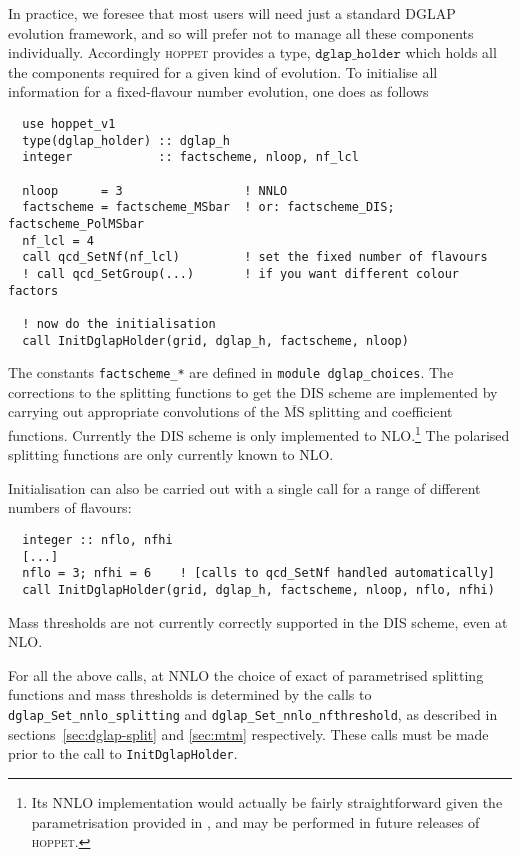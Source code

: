 \documentclass[12pt]{article}
\newcommand{\MSbar}{\overline{\mathrm{MS}}}
\newcommand{\hoppet}{\textsc{hoppet}\xspace}
\newcommand{\ttt}[1]{\texttt{#1}}
\begin{document}
In practice, we foresee that most users will need just a standard
DGLAP evolution framework, and so will prefer not to manage
all these components individually. Accordingly \hoppet provides a
type, $\ttt{dglap\_holder}$ which holds all the components 
required for
a given kind of evolution. To initialise all information for a
fixed-flavour number evolution, one does as follows
%
\begin{lstlisting}
  use hoppet_v1
  type(dglap_holder) :: dglap_h
  integer            :: factscheme, nloop, nf_lcl  

  nloop      = 3                 ! NNLO
  factscheme = factscheme_MSbar  ! or: factscheme_DIS; factscheme_PolMSbar
  nf_lcl = 4
  call qcd_SetNf(nf_lcl)         ! set the fixed number of flavours
  ! call qcd_SetGroup(...)       ! if you want different colour factors

  ! now do the initialisation
  call InitDglapHolder(grid, dglap_h, factscheme, nloop)
\end{lstlisting}
The constants \ttt{factscheme\_*} are defined in \ttt{module
  dglap\_choices}. %
The corrections to the splitting functions to get the DIS scheme are
implemented by carrying out appropriate convolutions of the $\MSbar$
splitting and coefficient functions. Currently the DIS scheme is only
implemented to NLO.\footnote{Its NNLO implementation would actually be fairly
straightforward given the parametrisation provided in
\cite{White:2005wm}, and may be performed in
future releases of \hoppet.} %
The polarised splitting functions are only currently known to NLO.

Initialisation can also be carried out with a single call for a range of
different numbers of flavours:
\begin{lstlisting}
  integer :: nflo, nfhi
  [...]
  nflo = 3; nfhi = 6    ! [calls to qcd_SetNf handled automatically]
  call InitDglapHolder(grid, dglap_h, factscheme, nloop, nflo, nfhi)
\end{lstlisting}
Mass thresholds are not currently correctly supported in the DIS
scheme, even at NLO.

For all the above calls, at NNLO the choice of exact of parametrised
splitting functions and mass thresholds is determined by the calls to
\ttt{dglap\_Set\_nnlo\_splitting} and
\ttt{dglap\_Set\_nnlo\_nfthreshold}, as described in
sections~\ref{sec:dglap-split} and \ref{sec:mtm} respectively. These
calls must be made prior to the call to \ttt{InitDglapHolder}.
\end{document}
